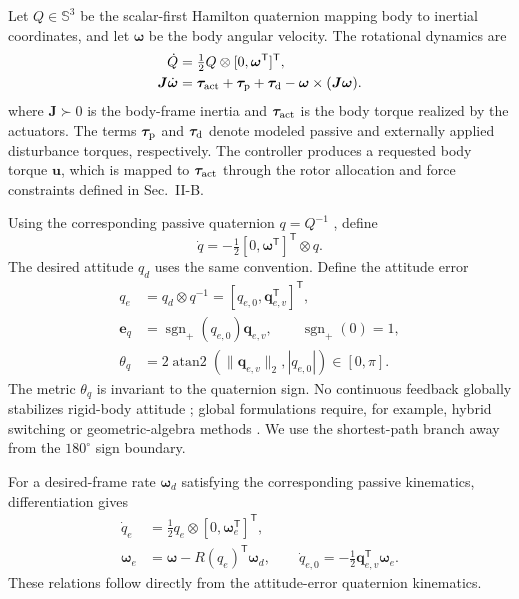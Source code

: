 \documentclass[letterpaper, 10 pt, conference]{ieeeconf}
\newcommand{\T}{^{\mathsf T}}
\newcommand{\sgnp}{\operatorname{sgn}_{+}}
\begin{document}
Let $Q\in\mathbb S^3$ be the scalar-first Hamilton quaternion mapping body to
inertial coordinates, and let $\bm\omega$ be the body angular velocity. The
rotational dynamics are \cite{schaub2018amss}
\begin{align}
 \dot Q&=\tfrac12 Q\otimes[0,\bm\omega\T]\T,\\
 \bm J\dot{\bm\omega}&=\bm\tau_{\rm act}+\bm\tau_{\rm p}
       +\bm\tau_{\rm d}-\bm\omega\times(\bm J\bm\omega).
 \label{eq:plant}
\end{align}
where $\bm J\succ0$ is the body-frame inertia and
$\bm\tau_{\rm act}$ is the body torque realized by the actuators.
The terms $\bm\tau_{\rm p}$ and $\bm\tau_{\rm d}$ denote modeled
passive and externally applied disturbance torques, respectively.
The controller produces a requested body torque $\bm u$, which is
mapped to $\bm\tau_{\rm act}$ through the rotor allocation and force
constraints defined in Sec.~II-B.

Using the corresponding passive quaternion $q=Q^{-1}$ \cite{diebel2006quaternion}, define
\begin{equation}
 \dot q=-\tfrac12[0,\bm\omega\T]\T\otimes q.
 \label{eq:passive}
\end{equation}
The desired attitude $q_d$ uses the same convention. Define the attitude error
\begin{align}
 q_e&=q_d\otimes q^{-1}=[q_{e,0},\bm q_{e,v}\T]\T,\\
 \bm e_q&=\sgnp(q_{e,0})\bm q_{e,v},\qquad \sgnp(0)=1,\\
 \theta_q&=2\operatorname{atan2}(\|\bm q_{e,v}\|_2,|q_{e,0}|)
             \in[0,\pi].
 \label{eq:theta}
\end{align}
The metric $\theta_q$ is invariant to the quaternion sign. No continuous feedback globally stabilizes rigid-body attitude \cite{chaturvedi2011rigid}; global formulations require, for example, hybrid switching \cite{mayhew2011hybrid} or geometric-algebra methods \cite{rubioscola2026ga}. We use the shortest-path branch away from the $180^\circ$ sign boundary.

For a desired-frame rate $\bm\omega_d$ satisfying the corresponding passive kinematics, differentiation gives
\begin{align}
 \dot q_e&=\tfrac12q_e\otimes[0,\bm\omega_e\T]\T,\\
 \bm\omega_e&=\bm\omega-R(q_e)\T\bm\omega_d,\qquad
 \dot q_{e,0}=-\tfrac12\bm q_{e,v}\T\bm\omega_e.
 \label{eq:errkin}
\end{align}
These relations follow directly from the attitude-error quaternion kinematics. 
\end{document}
